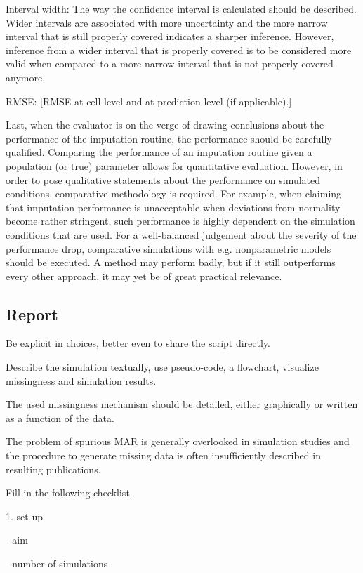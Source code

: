 \documentclass[bimj,fleqn]{w-art}
\theoremstyle{plain}
\theoremstyle{definition}
\begin{document}
Interval width: The way the confidence interval is calculated should be described. Wider intervals are associated with more uncertainty and the more narrow interval that is still properly covered indicates a sharper inference. However, inference from a wider interval that is properly covered is to be considered more valid when compared to a more narrow interval that is not properly covered anymore. 

RMSE: [RMSE at cell level and at prediction level (if applicable).]

Last, when the evaluator is on the verge of drawing conclusions about the performance of the imputation routine, the performance should be carefully qualified. Comparing the performance of an imputation routine given a population (or true) parameter allows for quantitative evaluation. However, in order to pose qualitative statements about the performance on simulated conditions, comparative methodology is required. For example, when claiming that imputation performance is unacceptable when deviations from normality become rather stringent, such performance is highly dependent on the simulation conditions that are used. For a well-balanced judgement about the severity of the performance drop, comparative simulations with e.g. nonparametric models should be executed. A method may perform badly, but if it still outperforms every other approach, it may yet be of great practical relevance.



\subsection{Report}

Be explicit in choices, better even to share the script directly. 

Describe the simulation textually, use pseudo-code, a flowchart, visualize missingness and simulation results.

The used missingness mechanism should be detailed, either graphically or written as a function of the data. 

The problem of spurious MAR is generally overlooked in simulation studies and the procedure to generate missing data is often insufficiently described in resulting publications. 


Fill in the following checklist.

1. set-up

- aim

- number of simulations
\end{document}
